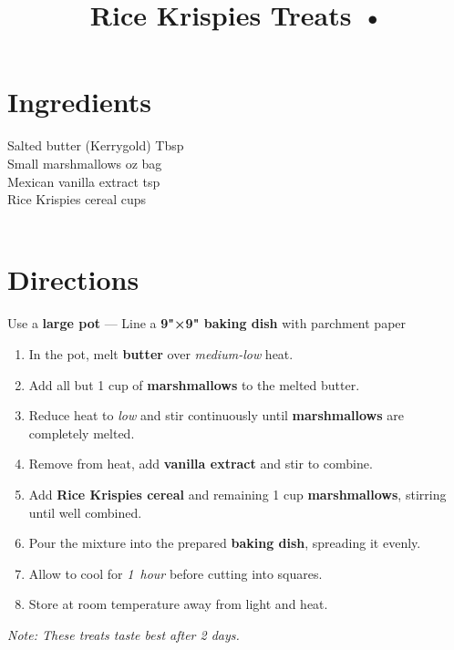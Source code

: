 \documentclass[11pt,letterpaper]{article}
\title{Rice Krispies Treats  •}
\author{}
\date{}
\begin{document}
\maketitle
\thispagestyle{empty}

\section*{Ingredients}
\setlength{\columnsep}{20pt}
\begin{multicols}{2}
\noindent
    Salted butter (Kerrygold)  Tbsp \\
    Small marshmallows  oz bag \\
    Mexican vanilla extract  tsp \\
    Rice Krispies cereal  cups \\
    \columnbreak
    \\
\end{multicols}

\section*{Directions}

\noindent
Use a \textbf{large pot} ---
Line a \textbf{9"×9" baking dish} with parchment paper

\begin{enumerate}
    \item In the pot, melt \textbf{butter} over \textit{medium-low} heat.
    \item Add all but 1 cup of \textbf{marshmallows} to the melted butter.
    \item Reduce heat to \textit{low} and stir continuously until \textbf{marshmallows} are completely melted.
    \item Remove from heat, add \textbf{vanilla extract} and stir to combine.
    \item Add \textbf{Rice Krispies cereal} and remaining 1 cup \textbf{marshmallows}, stirring until well combined.
    \item Pour the mixture into the prepared \textbf{baking dish}, spreading it evenly.
    \item Allow to cool for \textit{1~hour} before cutting into squares.
    \item Store at room temperature away from light and heat.
\end{enumerate}

\noindent
\textit{Note: These treats taste best after 2 days.}
\\
\end{document}
